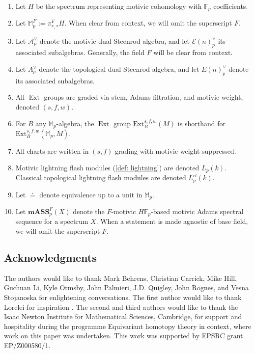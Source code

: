 \documentclass{amsart}
\theoremstyle{plain}
\numberwithin{theorem}{section}
\numberwithin{equation}{section}
\numberwithin{figure}{section}
\DeclareMathOperator{\Ext}{Ext}
\newcommand{\mF}{{\mathbb F}}
\newcommand{\cA}{{\mathcal A}}
\newcommand{\cE}{{\mathcal E}}
\newcommand{\0}{\langle 0 \rangle }
\begin{document}
\begin{enumerate}
    \item Let $H$ be the spectrum representing motivic cohomology with $\mF_p$ coefficients.
    \item Let $\mathbb{M}_p^F:= \pi_{*,*}^FH$. When clear from context, we will omit the superscript $F$.
    \item Let $\cA_p^\vee$ denote the motivic dual Steenrod algebra, and let $\cE(n)_p^\vee$ its associated subalgebras. Generally, the field $F$ will be clear from context.
    \item Let $A^\vee_{p}$ denote the topological dual Steenrod algebra, and let $E(n)^\vee_{p}$ denote its associated subalgebras.
    \item All $\Ext$ groups are graded via stem, Adams filtration, and motivic weight, denoted $(s,f,w)$.
    \item For $B$ any $\mathbb{M}_p$-algebra, the $\Ext$ group $\text{Ext}^{s,f,w}_B(M)$ is shorthand for \\   
    $\text{Ext}_B^{s,f,w}(\mathbb{M}_p, M)$.
    \item All charts are written in $(s,f)$ grading with motivic weight suppressed.
    \item Motivic lightning flash modules (\cref{def: lightning}) are denoted $L_p(k)$. Classical topological lightning flash modules are denoted $L^{cl}_p(k)$.
    \item Let $\doteq$ denote equivalence up to a unit in $\mathbb{M}_p$.
    \item Let $\textbf{mASS}_p^F(X)$ denote the $F$-motivic $H\mathbb{F}_p$-based motivic Adams spectral sequence for a spectrum $X$. When a statement is made agnostic of base field, we will omit the superscript $F$.
\end{enumerate}


\subsection*{Acknowledgments} The authors would like to thank Mark Behrens, Christian Carrick, Mike Hill, Guchuan Li, Kyle Ormsby, John Palmieri, J.D. Quigley, John Rognes, and Vesna Stojanoska for enlightening conversations. The first author would like to thank Lorelei for inspiration \cite{ThisIsLorelei}. The second and third authors would like to thank the Isaac Newton Institute for Mathematical Sciences, Cambridge, for support and hospitality during the programme Equivariant homotopy theory in context, where work on this paper was undertaken. This work was supported by EPSRC grant EP/Z000580/1. 
\end{document}
